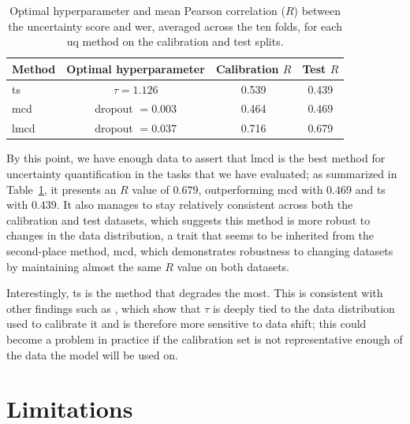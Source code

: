 \documentclass[runningheads]{llncs}
\newcommand{\tsTemp}{1.126}             %
\newcommand{\tsCalibrationR}{0.539}     %
\newcommand{\tsTestR}{0.439}            %
\newcommand{\mcdRate}{0.003}            %
\newcommand{\mcdCalibrationR}{0.464}    %
\newcommand{\mcdTestR}{0.469}           %
\newcommand{\lmcdRate}{0.037}           %
\newcommand{\lmcdCalibrationR}{0.716}   %
\newcommand{\lmcdTestR}{0.679}          %
\begin{document}
\begin{table}[htbp]
    \centering
    \begin{tabular}{|l|c|c|c|}
        \hline
        Method          & Optimal hyperparameter & Calibration $R$   & Test $R$   \\ \hline
        \acrshort{ts}   & $\tau = \tsTemp$       & \tsCalibrationR   & \tsTestR   \\ \hline
        \acrshort{mcd}  & dropout $= \mcdRate$   & \mcdCalibrationR  & \mcdTestR  \\ \hline
        \acrshort{lmcd} & dropout $= \lmcdRate$  & \lmcdCalibrationR & \lmcdTestR \\ \hline
    \end{tabular}
    \caption{Optimal hyperparameter and mean Pearson correlation ($R$) between the uncertainty score and \acrshort{wer}, averaged across the ten folds, for each \acrshort{uq} method on the calibration and test splits.}
    \label{tab:summary}
\end{table}

By this point, we have enough data to assert that \acrshort{lmcd} is the best method for uncertainty quantification in the tasks that we have evaluated; as summarized in Table~\ref{tab:summary}, it presents an $R$ value of $\lmcdTestR$, outperforming \acrshort{mcd} with $\mcdTestR$ and \acrshort{ts} with $\tsTestR$. It also manages to stay relatively consistent across both the calibration and test datasets, which suggests this method is more robust to changes in the data distribution, a trait that seems to be inherited from the second-place method, \acrshort{mcd}, which demonstrates robustness to changing datasets by maintaining almost the same $R$ value on both datasets.

Interestingly, \acrshort{ts} is the method that degrades the most. This is consistent with other findings such as \cite{yu2022robust}\cite{mozafari2018attended}, which show that $\tau$ is deeply tied to the data distribution used to calibrate it and is therefore more sensitive to data shift; this could become a problem in practice if the calibration set is not representative enough of the data the model will be used on.


\section{Limitations}
\end{document}
